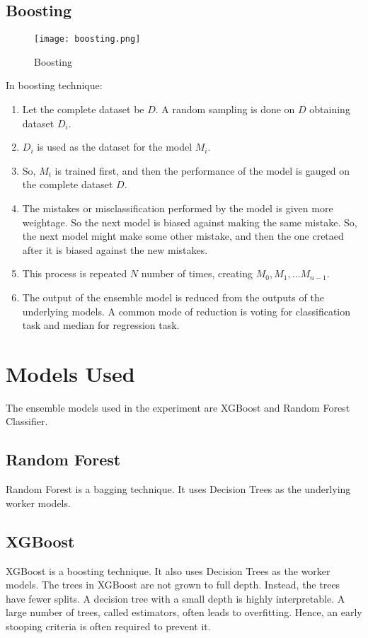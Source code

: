 \subsection{Boosting}

\begin{figure}[H]
\centering
\texttt{[image: boosting.png]}
\caption{Boosting}
\label{fig-6-2}
\end{figure}

In boosting technique:
\begin{enumerate}
    \item Let the complete dataset be $D$. A random sampling is done on $D$ obtaining dataset $D_i$.
    \item $D_i$ is used as the dataset for the model $M_i$.
    \item So, $M_i$ is trained first, and then the performance of the model is gauged on the complete dataset $D$.
    \item The mistakes or misclassification performed by the model is given more weightage. So the next model is biased against making the same mistake. So, the next model might make some other mistake, and then the one cretaed after it is biased against the new mistakes.
    \item This process is repeated $N$ number of times, creating $M_0, M_1, \ldots M_{n - 1}$.
    \item The output of the ensemble model is reduced from the outputs of the underlying models. A common mode of reduction is voting for classification task and median for regression task.
\end{enumerate}

\section{Models Used}
The ensemble models used in the experiment are XGBoost and Random Forest Classifier.

\subsection{Random Forest}

Random Forest is a bagging technique. It uses Decision Trees as the underlying worker models.

\subsection{XGBoost}

XGBoost is a boosting technique. It also uses Decision Trees as the worker models. The trees in XGBoost are not grown to full depth. Instead, the trees have fewer splits. A decision tree with a small depth is highly interpretable. A large number of trees, called estimators, often leads to overfitting. Hence, an early stooping criteria is often required to prevent it.


